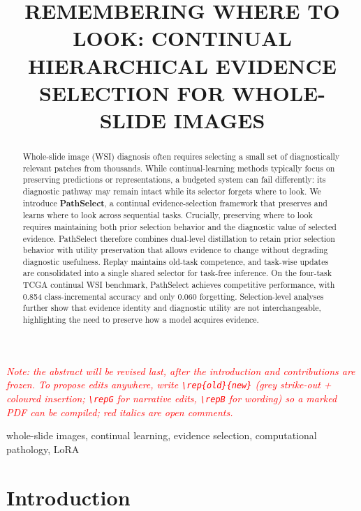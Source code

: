 \documentclass{article}
\title{REMEMBERING WHERE TO LOOK: CONTINUAL HIERARCHICAL EVIDENCE SELECTION FOR WHOLE-SLIDE IMAGES}
\newcommand{\note}[1]{\textcolor{red}{\textit{#1}}}  %
\begin{document}
\ninept
\maketitle

\note{Note: the abstract will be revised last, after the introduction and contributions are frozen. To propose edits anywhere, write \texttt{\textbackslash rep\{old\}\{new\}} (grey strike-out + coloured insertion; \texttt{\textbackslash repG} for narrative edits, \texttt{\textbackslash repB} for wording) so a marked PDF can be compiled; red italics are open comments.}

\begin{abstract}
Whole-slide image (WSI) diagnosis often requires selecting a small set of diagnostically relevant patches from thousands. While continual-learning methods typically focus on preserving predictions or representations, a budgeted system can fail differently: its diagnostic pathway may remain intact while its selector forgets where to look. We introduce \textbf{PathSelect}, a continual evidence-selection framework that preserves and learns where to look across sequential tasks. Crucially, preserving where to look requires maintaining both prior selection behavior and the diagnostic value of selected evidence. PathSelect therefore combines dual-level distillation to retain prior selection behavior with utility preservation that allows evidence to change without degrading diagnostic usefulness. Replay maintains old-task competence, and task-wise updates are consolidated into a single shared selector for task-free inference. On the four-task TCGA continual WSI benchmark, PathSelect achieves competitive performance, with 0.854 class-incremental accuracy and only 0.060 forgetting. Selection-level analyses further show that evidence identity and diagnostic utility are not interchangeable, highlighting the need to preserve how a model acquires evidence.
\end{abstract}

\begin{keywords}
whole-slide images, continual learning, evidence selection, computational pathology, LoRA
\end{keywords}

\section{Introduction}
\label{sec:intro}
\end{document}
